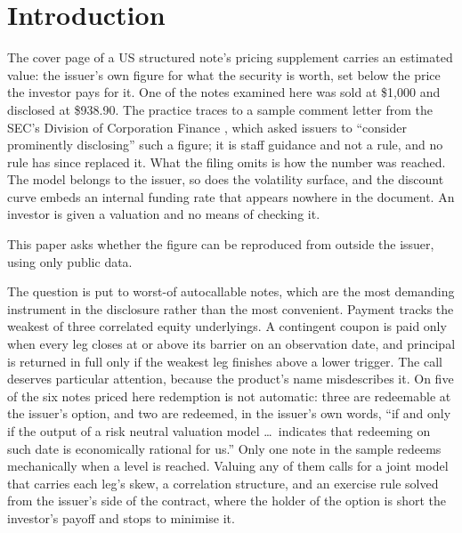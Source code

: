 \section{Introduction}\label{sec:intro}

The cover page of a US structured note's pricing supplement carries an estimated
value: the issuer's own figure for what the security is worth, set below the
price the investor pays for it. One of the notes examined here was sold at
\$1{,}000 and disclosed at \$938.90. The practice traces to a sample comment
letter from the SEC's Division of Corporation Finance \citeyearpar{SEC2012},
which asked issuers to ``consider prominently disclosing'' such a figure; it is
staff guidance and not a rule, and no rule has since replaced it. What the filing
omits is how the number was reached. The model belongs to the issuer, so does
the volatility surface, and the discount curve embeds an internal funding rate
that appears nowhere in the document. An investor is given a valuation and no
means of checking it.

This paper asks whether the figure can be reproduced from outside the issuer,
using only public data.

The question is put to worst-of autocallable notes, which are the most
demanding instrument in the disclosure rather than the most convenient. Payment
tracks the weakest of three correlated equity underlyings. A contingent coupon
is paid only when every leg closes at or above its barrier on an observation
date, and principal is returned in full only if the weakest leg finishes above
a lower trigger. The call deserves particular attention, because the product's
name misdescribes it. On five of the six notes priced here redemption is not
automatic: three are redeemable at the issuer's option, and two are redeemed,
in the issuer's own words, ``if and only if the output of a risk neutral
valuation model \ldots\ indicates that redeeming on such date is economically
rational for us.'' Only one note in the sample redeems mechanically when a
level is reached. Valuing any of them calls for a joint model that carries each
leg's skew, a correlation structure, and an exercise rule solved from the
issuer's side of the contract, where the holder of the option is short the
investor's payoff and stops to minimise it.

